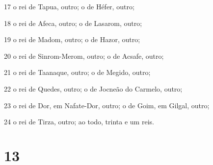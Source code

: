 \par 17 o rei de Tapua, outro; o de Héfer, outro;
\par 18 o rei de Afeca, outro; o de Lasarom, outro;
\par 19 o rei de Madom, outro; o de Hazor, outro;
\par 20 o rei de Sinrom-Merom, outro; o de Acsafe, outro;
\par 21 o rei de Taanaque, outro; o de Megido, outro;
\par 22 o rei de Quedes, outro; o de Jocneão do Carmelo, outro;
\par 23 o rei de Dor, em Nafate-Dor, outro; o de Goim, em Gilgal, outro;
\par 24 o rei de Tirza, outro; ao todo, trinta e um reis.

\chapter{13}

